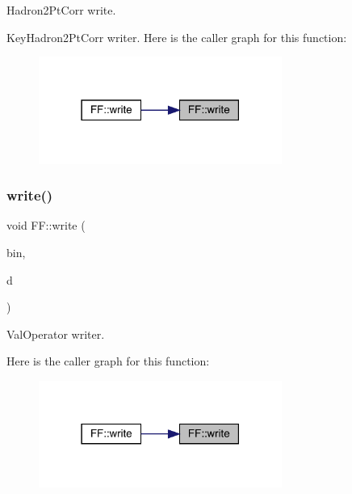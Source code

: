Hadron2\+Pt\+Corr write. 

Key\+Hadron2\+Pt\+Corr writer. Here is the caller graph for this function\+:
\nopagebreak
\begin{figure}[H]
\begin{center}
\leavevmode
\includegraphics[width=226pt]{d5/da6/namespaceFF_a1b83f6ebd714e1d672d8c425605ff1de_icgraph}
\end{center}
\end{figure}
\mbox{\label{namespaceFF_a6906b2ce111930a390f4a8e81b1730b6}} 
\subsubsection{\texorpdfstring{write()}{write()}\hspace{0.1cm}{\footnotesize\ttfamily [12/13]}}
{\footnotesize\ttfamily void F\+F\+::write (\begin{DoxyParamCaption}\item[{\mbox{\hyperlink{classADATIO_1_1BinaryWriter}{Binary\+Writer}} \&}]{bin,  }\item[{const \mbox{\hyperlink{classFF_1_1DiscoValOperator__t}{Disco\+Val\+Operator\+\_\+t}} \&}]{d }\end{DoxyParamCaption})}



Val\+Operator writer. 

Here is the caller graph for this function\+:
\nopagebreak
\begin{figure}[H]
\begin{center}
\leavevmode
\includegraphics[width=226pt]{d5/da6/namespaceFF_a6906b2ce111930a390f4a8e81b1730b6_icgraph}
\end{center}
\end{figure}
\mbox{\label{namespaceFF_a7d3abdd11ac7f8c96ec4cfab1360b20a}} 
